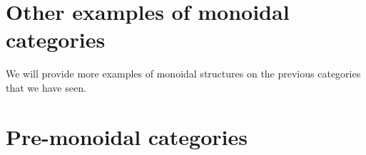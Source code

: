 \section{Other examples of monoidal categories}
\begin{publictodo}
    We will provide more examples of monoidal structures
    on the previous categories that we have seen.
\end{publictodo}

\section{Pre-monoidal categories}
\label{sec:premonoidal}
\publictodomessage


\devel{
    
}
